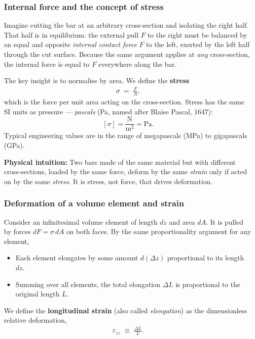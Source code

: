 \subsubsection*{Internal force and the concept of stress}

Imagine cutting the bar at an arbitrary cross-section and isolating the
right half.  That half is in equilibrium: the external pull $F$ to the
right must be balanced by an equal and opposite \emph{internal contact
force} $F$ to the left, exerted by the left half through the cut surface.
Because the same argument applies at \emph{any} cross-section, the
internal force is equal to $F$ everywhere along the bar.

The key insight is to normalise by area.  We define the \textbf{stress}
\begin{align}
    \sigma \;=\; \frac{F}{A},
    \label{eq:lec02:stress_def}
\end{align}
which is the force per unit area acting on the cross-section.  Stress
has the same SI units as pressure — \emph{pascals} (Pa, named after
Blaise Pascal, 1647):
\[
    [\sigma] = \frac{\text{N}}{\text{m}^2} = \text{Pa}.
\]
Typical engineering values are in the range of megapascals (MPa) to
gigapascals (GPa).

\textbf{Physical intuition:} Two bars made of the same material but with
different cross-sections, loaded by the same force, deform by the same
\emph{strain} only if acted on by the same \emph{stress}.  It is stress,
not force, that drives deformation.

\subsubsection*{Deformation of a volume element and strain}

Consider an infinitesimal volume element of length $dz$ and area $dA$.
It is pulled by forces $dF = \sigma\,dA$ on both faces.  By the same
proportionality argument for any element,

\begin{itemize}
    \item Each element elongates by some amount $d(\Delta z)$ proportional
          to its length $dz$.
    \item Summing over all elements, the total elongation $\Delta L$ is
          proportional to the original length $L$.
\end{itemize}

We define the \textbf{longitudinal strain} (also called \emph{elongation}) as the dimensionless relative deformation,
\begin{align}
    \varepsilon_{zz} \;\equiv\; \frac{\Delta L}{L}.
    \label{eq:lec02:strain_def}
\end{align}

